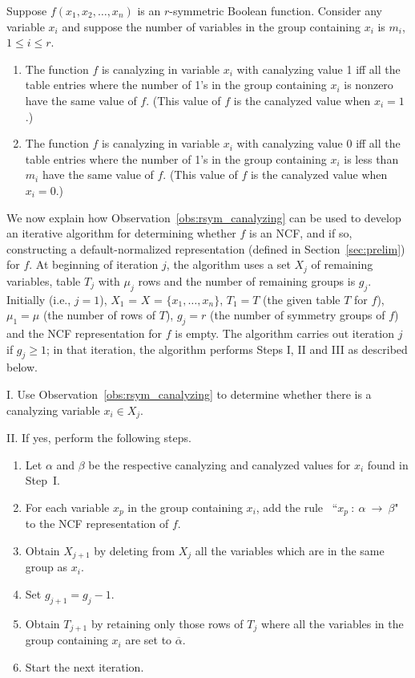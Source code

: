 \begin{observation}\label{obs:rsym_canalyzing}
Suppose $f(x_1, x_2, \ldots, x_n)$ is an $r$-symmetric Boolean function.
Consider any variable $x_i$ and suppose
the number of variables in the group
containing $x_i$ is $m_i$, $1 \leq i \leq r$.
\begin{enumerate}
\item The function $f$ is canalyzing in variable $x_i$
with canalyzing value 1 iff all the table entries where the number
of 1's in the group containing $x_i$ is nonzero have the same value
of $f$. (This value of $f$ is the canalyzed value when $x_i = 1$.)
\item The function $f$ is canalyzing in variable $x_i$ with
canalyzing value 0 iff all the table entries where the number of
1's in the group containing $x_i$ is less than $m_i$ have the same
value of $f$. (This value of $f$ is the canalyzed value when $x_i = 0$.)
\QED
\end{enumerate}
\end{observation}
We now explain how Observation~\ref{obs:rsym_canalyzing} can be
used to develop an iterative algorithm for determining whether 
$f$ is an NCF, and if so, constructing a default-normalized 
representation (defined in Section~\ref{sec:prelim}) for $f$.
At beginning of iteration $j$, the algorithm uses a set $X_j$ of remaining variables,
table $T_j$ with $\mu_j$ rows and the number of remaining groups is $g_j$.
Initially (i.e., $j = 1$), $X_1$ = $X$ = $\{x_1, \ldots, x_n\}$,
$T_1 = T$ (the given table $T$ for $f$), 
$\mu_1 = \mu$ (the number of rows of $T$), $g_j = r$ (the number of
symmetry groups of $f$) and the NCF representation for $f$ is empty.
The algorithm carries out iteration $j$ if $g_j \geq 1$; 
in that iteration, the algorithm performs Steps I, II and III
as described below.

\smallskip
\noindent
I. Use Observation~\ref{obs:rsym_canalyzing} to determine whether there is
a canalyzing variable $x_i \in X_j$. 

\smallskip
\noindent
II. If yes, perform the following steps. 
\begin{enumerate}
\item Let $\alpha$ and $\beta$ be the respective canalyzing and 
canalyzed values for $x_i$ found in Step~I. 
\item For each variable $x_p$ in the group containing $x_i$, add the rule~
``$x_p~:~\alpha ~\longrightarrow~ \beta$"~ to the NCF representation of $f$.
\item Obtain $X_{j+1}$ by deleting from $X_j$ all the variables which are 
in the same group as $x_i$.
\item Set $g_{j+1} = g_j - 1$.
\item Obtain $T_{j+1}$ by retaining only those rows of $T_j$ where all the
variables in the group containing $x_i$ are set to $\overline{\alpha}$. 
\item Start the next iteration.
\end{enumerate}


